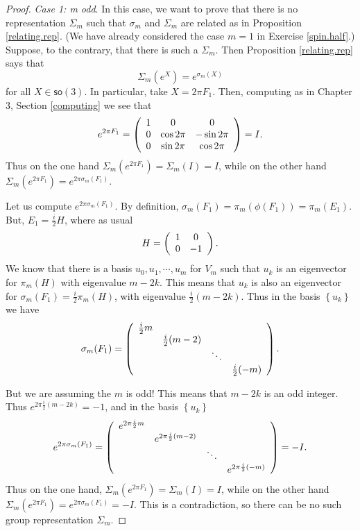 \documentclass[12pt]{amsbook}
\theoremstyle{plain}
\numberwithin{equation}{chapter}
\numberwithin{theorem}{chapter}
\begin{document}
\begin{proof}
\textit{Case 1: m odd}. In this case, we want to prove that there is no
representation $\Sigma_{m}$ such that $\sigma_{m}$ and $\Sigma_{m}$ are
related as in Proposition \ref{relating.rep}. (We have already considered the
case $m=1$ in Exercise \ref{spin.half}.) Suppose, to the contrary, that there
is such a $\Sigma_{m}$. Then Proposition \ref{relating.rep} says that
\[
\Sigma_{m}(e^{X})=e^{\sigma_{m}(X)}%
\]
for all $X\in\mathsf{so}(3)$. In particular, take $X=2\pi F_{1}$. Then,
computing as in Chapter 3, Section \ref{computing} we see that
\[
e^{2\pi F_{1}}=\left(
\begin{array}
[c]{ccc}%
1 & 0 & 0\\
0 & \cos2\pi & -\sin2\pi\\
0 & \sin2\pi & \cos2\pi
\end{array}
\right)  =I\text{.}%
\]
Thus on the one hand $\Sigma_{m}\left(  e^{2\pi F_{1}}\right)  =\Sigma
_{m}(I)=I$, while on the other hand $\Sigma_{m}\left(  e^{2\pi F_{1}}\right)
=e^{2\pi\sigma_{m}(F_{1})}$.

Let us compute $e^{2\pi\sigma_{m}(F_{1})}$. By definition, $\sigma_{m}%
(F_{1})=\pi_{m}(\phi(F_{1}))=\pi_{m}(E_{1})$. But, $E_{1}=\frac{i}{2}H$, where
as usual
\[
H=\left(
\begin{array}
[c]{cc}%
1 & 0\\
0 & -1
\end{array}
\right)  \text{.}%
\]
We know that there is a basis $u_{0},u_{1},\cdots,u_{m}$ for $V_{m}$ such that
$u_{k}$ is an eigenvector for $\pi_{m}(H)$ with eigenvalue $m-2k$. This means
that $u_{k}$ is also an eigenvector for $\sigma_{m}(F_{1})=\frac{i}{2}\pi
_{m}(H)$, with eigenvalue $\frac{i}{2}(m-2k)$. Thus in the basis $\left\{
u_{k}\right\}  $ we have
\[
\sigma_{m}(F_{1})=\left(
\begin{array}
[c]{cccc}%
\frac{i}{2}m &  &  & \\
& \frac{i}{2}(m-2) &  & \\
&  & \ddots & \\
&  &  & \frac{i}{2}(-m)
\end{array}
\right)  \text{.}%
\]

But we are assuming the $m$ is odd! This means that $m-2k$ is an odd integer.
Thus $e^{2\pi\frac{i}{2}(m-2k)}=-1$, and in the basis $\left\{  u_{k}\right\}
$%
\[
e^{2\pi\sigma_{m}(F_{1})}=\left(
\begin{array}
[c]{cccc}%
e^{2\pi\frac{i}{2}m} &  &  & \\
& e^{2\pi\frac{i}{2}(m-2)} &  & \\
&  & \ddots & \\
&  &  &  e^{2\pi\frac{i}{2}(-m)}%
\end{array}
\right)  =-I\text{.}%
\]
Thus on the one hand, $\Sigma_{m}\left(  e^{2\pi F_{1}}\right)  =\Sigma
_{m}(I)=I$, while on the other hand $\Sigma_{m}\left(  e^{2\pi F_{1}}\right)
=e^{2\pi\sigma_{m}(F_{1})}=-I$. This is a contradiction, so there can be no
such group representation $\Sigma_{m}$.


\end{proof}
\end{document}
